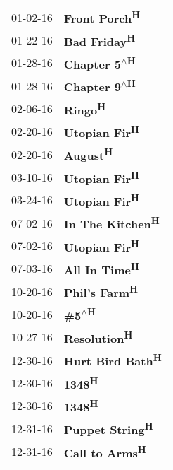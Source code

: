 \begin{supertabular}{p{0.25\columnwidth}p{0.75\columnwidth}}
 01-02-16 &        \textbf{Front Porch\textsuperscript{H}} \\
 01-22-16 &         \textbf{Bad Friday\textsuperscript{H}} \\
 01-28-16 &  \textbf{Chapter 5\textsuperscript{$\wedge$H}} \\
 01-28-16 &  \textbf{Chapter 9\textsuperscript{$\wedge$H}} \\
 02-06-16 &              \textbf{Ringo\textsuperscript{H}} \\
 02-20-16 &        \textbf{Utopian Fir\textsuperscript{H}} \\
 02-20-16 &             \textbf{August\textsuperscript{H}} \\
 03-10-16 &        \textbf{Utopian Fir\textsuperscript{H}} \\
 03-24-16 &        \textbf{Utopian Fir\textsuperscript{H}} \\
 07-02-16 &     \textbf{In The Kitchen\textsuperscript{H}} \\
 07-02-16 &        \textbf{Utopian Fir\textsuperscript{H}} \\
 07-03-16 &        \textbf{All In Time\textsuperscript{H}} \\
 10-20-16 &        \textbf{Phil's Farm\textsuperscript{H}} \\
 10-20-16 &        \textbf{\#5\textsuperscript{$\wedge$H}} \\
 10-27-16 &         \textbf{Resolution\textsuperscript{H}} \\
 12-30-16 &     \textbf{Hurt Bird Bath\textsuperscript{H}} \\
 12-30-16 &               \textbf{1348\textsuperscript{H}} \\
 12-30-16 &               \textbf{1348\textsuperscript{H}} \\
 12-31-16 &      \textbf{Puppet String\textsuperscript{H}} \\
 12-31-16 &       \textbf{Call to Arms\textsuperscript{H}} \\
\end{supertabular}
